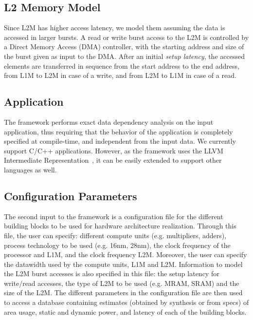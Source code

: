 \subsection{L2 Memory Model}
\label{ssec:layer2_model}
\vspace{-1mm}
Since L2M has higher access latency, we model them assuming the data is accessed in larger bursts.
A read or write burst access to the L2M is controlled by a Direct Memory Access (DMA) controller, with the starting address and size of the burst given as input to the DMA. After an initial \textit{setup latency}, the accessed elements are transferred in sequence from the start address to the end address, from L1M to L2M in case of a write, and from L2M to L1M in case of a read.

\vspace{-1mm}
\subsection{Application}
\label{ssec:app}
\vspace{-1mm}
The framework performs exact data dependency analysis on the input application, thus requiring that the behavior of the application is completely specified at compile-time, and independent from the input data. We currently support C/C++ applications. However, as the framework uses the LLVM Intermediate Representation~\cite{llvm}, it can be easily extended to support other languages as well.

\vspace{-1mm}
\subsection{Configuration Parameters}
\label{ssec:conf_param}
\vspace{-1mm}
The second input to the framework is a configuration file for the different building blocks to be used for hardware architecture realization. Through this file, the user can specify: different compute units (e.g. multipliers, adders), process technology to be used (e.g. 16nm, 28nm), the clock frequency of the processor and L1M, and the clock frequency L2M. Moreover, the user can specify the datawidth used by the compute units, L1M and L2M. 
Information to model the L2M burst accesses is also specified in this file: the setup latency for write/read accesses, the type of L2M to be used (e.g. MRAM, SRAM) and the size of the L2M. The different parameters in the configuration file are then used to access a database containing estimates (obtained by synthesis or from specs) of area usage, static and dynamic power, and latency of each of the building blocks.

